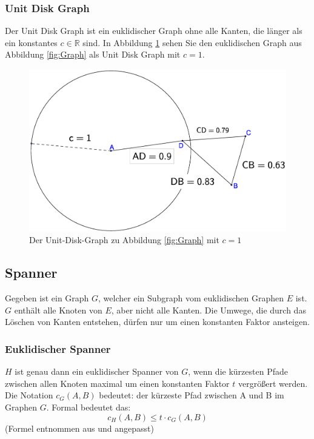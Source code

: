 \documentclass[a4paper,twoside]{IEEEtran}
\begin{document}
\subsubsection{Unit Disk Graph}
Der Unit Disk Graph ist ein euklidischer Graph ohne alle Kanten, die länger als ein konstantes $c \in \mathds{R} $ sind.
In Abbildung \ref{fig:UnitGraph} sehen Sie den euklidischen Graph aus Abbildung \ref{fig:Graph} als Unit Disk Graph mit $c = 1 $.
\begin{figure}[h!]
\centering
\includegraphics[width=0.99\linewidth]{UnitGraph.eps}
\caption{Der Unit-Disk-Graph zu Abbildung \ref{fig:Graph} mit $c = 1 $}
\label{fig:UnitGraph}
\end{figure}



\subsection{Spanner}
Gegeben ist ein Graph $G $, welcher ein Subgraph vom euklidischen Graphen $E $ ist.
$G $ enthält alle Knoten von $E $, aber nicht alle Kanten. 
Die Umwege, die durch das Löschen von Kanten entstehen, dürfen nur um einen konstanten Faktor ansteigen. 

\subsubsection{Euklidischer Spanner}
$H $ ist genau dann ein euklidischer Spanner von $G $, wenn die kürzesten Pfade zwischen allen Knoten maximal um einen konstanten Faktor $t $ vergrößert werden.
Die Notation $c_{G}(A, B) $ bedeutet: der kürzeste Pfad zwischen A und B im Graphen $G $.
Formal bedeutet das:
\begin{equation}
	c_H(A, B) \leq t \cdot c_G(A, B)
\end{equation}
{\footnotesize (Formel entnommen aus \cite{kanj} und angepasst)}
\end{document}
